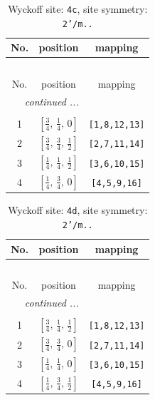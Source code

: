 \documentclass[fleqn,8pt]{jsarticle}
\begin{document}
\renewcommand{\arraystretch}{1.2}
\begin{longtable}{ccc}
\caption{Wyckoff site: {\tt 4c}, site symmetry: {\tt 2'/m..}}
 \\
 \hline \hline
No. & position & mapping \\ \hline \endfirsthead

\multicolumn{2}{l}{\tablename\ \thetable{}} \\
 \hline \hline
No. & position & mapping \\ \hline \endhead

 \hline \hline
\multicolumn{2}{r}{\footnotesize\it continued ...} \\ \endfoot

 \hline \hline
\multicolumn{2}{r}{} \\ \endlastfoot

1 & $\left[ \frac{3}{4},\, \frac{1}{4},\, 0 \right]$ & {\tt [1,8,12,13]} \\ \hline
2 & $\left[ \frac{3}{4},\, \frac{3}{4},\, \frac{1}{2} \right]$ & {\tt [2,7,11,14]} \\ \hline
3 & $\left[ \frac{1}{4},\, \frac{1}{4},\, \frac{1}{2} \right]$ & {\tt [3,6,10,15]} \\ \hline
4 & $\left[ \frac{1}{4},\, \frac{3}{4},\, 0 \right]$ & {\tt [4,5,9,16]} \\
\end{longtable}
\renewcommand{\arraystretch}{1.2}
\begin{longtable}{ccc}
\caption{Wyckoff site: {\tt 4d}, site symmetry: {\tt 2'/m..}}
 \\
 \hline \hline
No. & position & mapping \\ \hline \endfirsthead

\multicolumn{2}{l}{\tablename\ \thetable{}} \\
 \hline \hline
No. & position & mapping \\ \hline \endhead

 \hline \hline
\multicolumn{2}{r}{\footnotesize\it continued ...} \\ \endfoot

 \hline \hline
\multicolumn{2}{r}{} \\ \endlastfoot

1 & $\left[ \frac{3}{4},\, \frac{1}{4},\, \frac{1}{2} \right]$ & {\tt [1,8,12,13]} \\ \hline
2 & $\left[ \frac{3}{4},\, \frac{3}{4},\, 0 \right]$ & {\tt [2,7,11,14]} \\ \hline
3 & $\left[ \frac{1}{4},\, \frac{1}{4},\, 0 \right]$ & {\tt [3,6,10,15]} \\ \hline
4 & $\left[ \frac{1}{4},\, \frac{3}{4},\, \frac{1}{2} \right]$ & {\tt [4,5,9,16]} \\
\end{longtable}
\end{document}
